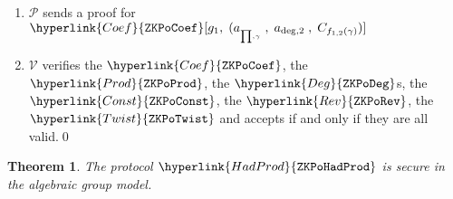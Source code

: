 \documentclass[11pt, lettersize, notitlepage, leqno, footskip=0.6cm]{article}
\newcommand{\mc}{\mathcal}
\newcommand{\mP}{\mc{P}}
\newcommand{\V}{\mc{V}}
\newtheorem{Thm}{Theorem}[section]
\numberwithin{equation}{section}
\begin{document}
\begin{mdframed}
\begin{enumerate}[wide, labelwidth=!, labelindent=0pt]
\item $\mP$ sends a proof for $\hyperlink{Coef}{\tt{ZKPoCoef}}[g_1,\;( a_{_{\prod , \gamma}}\;, \;a_{\deg,2}\;,\; C_{f_{1,2}(\gamma)})]$

\item $\V$ verifies the $\hyperlink{Coef}{\tt{ZKPoCoef}}$, the $\hyperlink{Prod}{\tt{ZKPoProd}}$, the $\hyperlink{Deg}{\tt{ZKPoDeg}}$s, the $\hyperlink{Const}{\tt{ZKPoConst}}$, the $\hyperlink{Rev}{\tt{ZKPoRev}}$, the $\hyperlink{Twist}{\tt{ZKPoTwist}}$ and accepts if and only if they are all valid.\qed

\end{enumerate}

\end{mdframed}

\bigskip

\begin{Thm} The protocol $\hyperlink{HadProd}{\tt{ZKPoHadProd}}$ is secure in the algebraic group model. \end{Thm}
\end{document}
